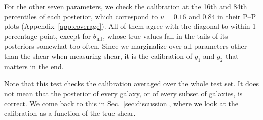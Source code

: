 For the other seven parameters, we check the calibration at the 16th and 84th percentiles of each posterior, which correspond to $u = 0.16$ and $0.84$ in their P--P plots (Appendix~\ref{app:coverage}). All of them agree with the diagonal to within 1 percentage point, except for $\theta_\mathrm{int}$, whose true values fall in the tails of its posteriors somewhat too often. Since we marginalize over all parameters other than the shear when measuring shear, it is the calibration of $g_1$ and $g_2$ that matters in the end.

Note that this test checks the calibration averaged over the whole test set. It does not mean that the posterior of every galaxy, or of every subset of galaxies, is correct. We come back to this in Sec.~\ref{sec:discussion}, where we look at the calibration as a function of the true shear.
